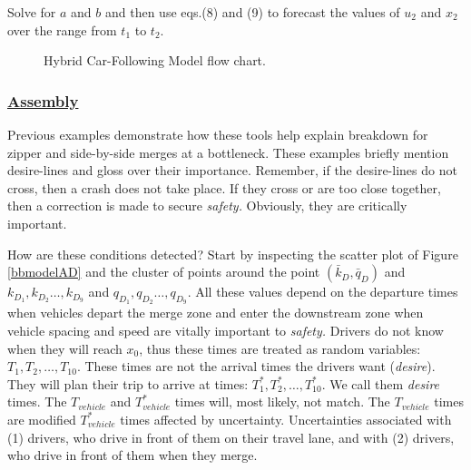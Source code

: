 \documentclass[Proceedings]{ascelike}
\begin{document}
\noindent Solve for $a$ and $b$ and then use eqs.(8) and (9) to forecast the values of $u_2$ and $x_2$ over the range from $t_1$ to $t_2$. 

\begin{figure}
\centering
{}
\caption{Hybrid Car-Following Model flow chart.}
\label{flow}
\end{figure}


\subsubsection{\underline{Assembly}}


Previous examples demonstrate how these tools help explain breakdown for zipper and side-by-side merges at a bottleneck. These examples briefly mention desire-lines and gloss over their importance. Remember, if the desire-lines do not cross, then a crash does not take place. If they cross or are too close together, then a correction is made to secure \emph{safety.} Obviously, they are critically important.

How are these conditions detected? Start by inspecting the scatter plot of Figure \ref{bbmodelAD} and the cluster of points around the point $(\bar{k}_D, \bar{q}_D)$ and $k_{D_1},k_{D_2} \ldots,k_{D_9}$ and $q_{D_1},q_{D_2} \ldots,q_{D_9}$. All these values depend on the departure times when vehicles depart the merge zone and enter the downstream zone when vehicle spacing and speed are vitally important to \emph{safety.} Drivers do not know when they will reach $x_0$, thus these times are treated as random variables: $T_1, T_2,\ldots,T_{10}$. These times are not the arrival  times the drivers want (\emph{desire}).  They will plan their trip to arrive at times: $T^*_1, T^*_2,\ldots,T^*_{10}$. We call them \emph{desire} times. The  $T_{vehicle}$ and $T_{vehicle}^*$ times will, most likely, not match.  The  $T_{vehicle}$  times are modified   $T_{vehicle}^*$ times affected by uncertainty. Uncertainties associated with (1) drivers,  who drive in front of them on their travel lane, and with (2) drivers, who drive in front of them when they merge.
\end{document}
